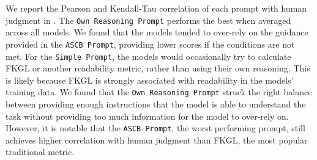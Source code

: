 

We report the Pearson and Kendall-Tau correlation of each prompt with human judgment in . The \texttt{Own Reasoning Prompt} performs the best when averaged across all models. We found that the models tended to over-rely on the guidance provided in the \texttt{ASCB Prompt}, providing lower scores if the conditions are not met. For the \texttt{Simple Prompt}, the models would occasionally try to calculate FKGL or another readability metric, rather than using their own reasoning. This is likely because FKGL is strongly associated with readability in the models' training data. We found that the \texttt{Own Reasoning Prompt} struck the right balance between providing enough instructions that the model is able to understand the task without providing too much information for the model to over-rely on. However, it is notable that the \texttt{ASCB Prompt}, the worst performing prompt, still achieves higher correlation with human judgment than FKGL, the most popular traditional metric. 




